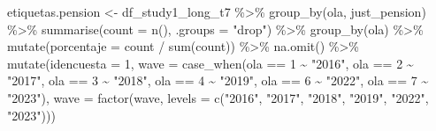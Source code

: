 \documentclass[
  12pt,
  letterpaper,
  DIV=11,
  numbers=noendperiod]{scrartcl}
\newenvironment{Shaded}{\begin{snugshade}}{\end{snugshade}}
\newcommand{\AttributeTok}[1]{\textcolor[rgb]{0.40,0.45,0.13}{#1}}
\newcommand{\DecValTok}[1]{\textcolor[rgb]{0.68,0.00,0.00}{#1}}
\newcommand{\FunctionTok}[1]{\textcolor[rgb]{0.28,0.35,0.67}{#1}}
\newcommand{\NormalTok}[1]{\textcolor[rgb]{0.00,0.23,0.31}{#1}}
\newcommand{\OtherTok}[1]{\textcolor[rgb]{0.00,0.23,0.31}{#1}}
\newcommand{\SpecialCharTok}[1]{\textcolor[rgb]{0.37,0.37,0.37}{#1}}
\newcommand{\StringTok}[1]{\textcolor[rgb]{0.13,0.47,0.30}{#1}}
\begin{document}
\begin{Shaded}
\begin{Highlighting}[]
\NormalTok{etiquetas.pension }\OtherTok{\textless{}{-}}\NormalTok{ df\_study1\_long\_t7 }\SpecialCharTok{\%\textgreater{}\%}
  \FunctionTok{group\_by}\NormalTok{(ola, just\_pension) }\SpecialCharTok{\%\textgreater{}\%}
  \FunctionTok{summarise}\NormalTok{(}\AttributeTok{count =} \FunctionTok{n}\NormalTok{(), }\AttributeTok{.groups =} \StringTok{"drop"}\NormalTok{) }\SpecialCharTok{\%\textgreater{}\%}
  \FunctionTok{group\_by}\NormalTok{(ola) }\SpecialCharTok{\%\textgreater{}\%}
  \FunctionTok{mutate}\NormalTok{(}\AttributeTok{porcentaje =}\NormalTok{ count }\SpecialCharTok{/} \FunctionTok{sum}\NormalTok{(count)) }\SpecialCharTok{\%\textgreater{}\%} 
  \FunctionTok{na.omit}\NormalTok{() }\SpecialCharTok{\%\textgreater{}\%} 
  \FunctionTok{mutate}\NormalTok{(}\AttributeTok{idencuesta =} \DecValTok{1}\NormalTok{,}
         \AttributeTok{wave =} \FunctionTok{case\_when}\NormalTok{(ola }\SpecialCharTok{==} \DecValTok{1} \SpecialCharTok{\textasciitilde{}} \StringTok{"2016"}\NormalTok{,}
\NormalTok{                          ola }\SpecialCharTok{==} \DecValTok{2} \SpecialCharTok{\textasciitilde{}} \StringTok{"2017"}\NormalTok{,}
\NormalTok{                          ola }\SpecialCharTok{==} \DecValTok{3} \SpecialCharTok{\textasciitilde{}} \StringTok{"2018"}\NormalTok{,}
\NormalTok{                          ola }\SpecialCharTok{==} \DecValTok{4} \SpecialCharTok{\textasciitilde{}} \StringTok{"2019"}\NormalTok{,}
\NormalTok{                          ola }\SpecialCharTok{==} \DecValTok{6} \SpecialCharTok{\textasciitilde{}} \StringTok{"2022"}\NormalTok{,}
\NormalTok{                          ola }\SpecialCharTok{==} \DecValTok{7} \SpecialCharTok{\textasciitilde{}} \StringTok{"2023"}\NormalTok{),}
         \AttributeTok{wave =} \FunctionTok{factor}\NormalTok{(wave, }\AttributeTok{levels =} \FunctionTok{c}\NormalTok{(}\StringTok{"2016"}\NormalTok{,}
                                        \StringTok{"2017"}\NormalTok{,}
                                        \StringTok{"2018"}\NormalTok{,}
                                        \StringTok{"2019"}\NormalTok{,}
                                        \StringTok{"2022"}\NormalTok{,}
                                        \StringTok{"2023"}\NormalTok{)))}


\end{Highlighting}
\end{Shaded}
\end{document}
